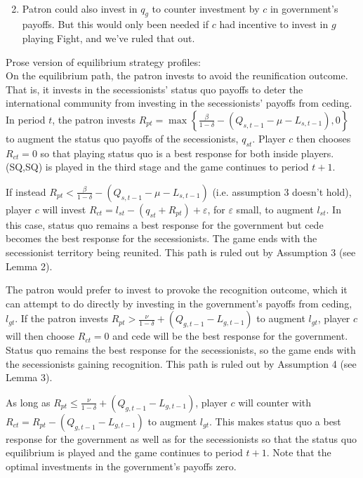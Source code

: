 \documentclass[12pt]{article}
\newcommand{\ve}{\varepsilon}
\newcommand{\de}{\delta}
\begin{document}
\begin{enumerate}
\begin{itemize}
\begin{itemize}
\begin{multline}
						\end{multline}
				\end{itemize}
		\end{itemize}
	\item Patron could also invest in $q_g$ to counter investment by $c$ in government's payoffs. But this would only been needed if $c$ had incentive to invest in $g$ playing Fight, and we've ruled that out.
\end{enumerate}


\newpage
Prose version of equilibrium strategy profiles: \\

On the equilibrium path, the patron invests to avoid the reunification outcome. That is, it invests in the secessionists' status quo payoffs to deter the international community from investing in the secessionists' payoffs from ceding. In period $t$, the patron invests $R_{pt} = \max\left\{\frac{\beta}{1-\de} - \left( Q_{s,t-1} - \mu - L_{s,t-1}\right),0\right\}$ to augment the status quo payoffs of the secessionists, $q_{st}$. Player $c$ then chooses $R_{ct} =0$ so that playing status quo is a best response for both inside players. (SQ,SQ) is played in the third stage and the game continues to period $t+1$.

If instead $R_{pt} < \frac{\beta}{1-\de} - \left( Q_{s,t-1} - \mu - L_{s,t-1}\right)$ (i.e. assumption 3 doesn't hold), player $c$ will invest $R_{ct} = l_{st} - \left(q_{st} + R_{pt} \right) + \ve$, for $\ve$ small, to augment $l_{st}$. In this case, status quo remains a best response for the government but cede becomes the best response for the secessionists. The game ends with the secessionist territory being reunited. This path is ruled out by Assumption 3 (see Lemma 2).

The patron would prefer to invest to provoke the recognition outcome, which it can attempt to do directly by investing in the government's payoffs from ceding, $l_{gt}$. If the patron invests $R_{pt} > \frac{\nu}{1-\de} + \left( Q_{g,t-1} - L_{g,t-1}\right)$ to augment $l_{gt}$, player $c$ will then choose $R_{ct} = 0$ and cede will be the best response for the government. Status quo remains the best response for the secessionists, so the game ends with the secessionists gaining recognition. This path is ruled out by Assumption 4 (see Lemma 3).

As long as $R_{pt} \leq \frac{\nu}{1-\de} + \left( Q_{g,t-1} - L_{g,t-1}\right)$, player $c$ will counter with $R_{ct} = R_{pt} - \left( Q_{g,t-1} - L_{g,t-1}\right)$ to augment $l_{gt}$. This makes status quo a best response for the government as well as for the secessionists so that the status quo equilibrium is played and the game continues to period $t+1$. Note that the optimal investments in the government's payoffs zero.
\end{document}
